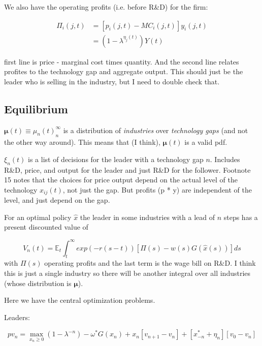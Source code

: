 \documentclass[11pt]{article}
\begin{document}
  We also have the operating profits (i.e. before R\&D) for the firm:
  
  \begin{align*} \label{eq:profits}
    \Pi_i(j, t) &= [p_i(j, t) - MC_i(j, t)]y_i(j, t)\\
                &= (1 - \lambda^{\eta_j(t)})Y(t)
  \end{align*}

  first line is price - marginal cost times quantity.  And the second line relates profites to the technology gap and aggregate output.  This should just be the leader who is selling in the industry, but I need to double check that.

\subsection{Equilibrium}
\label{sub:equilibrium}
  $\bm{\mu}(t) \equiv {\mu_n(t)}_n^\infty$ is a distribution of \emph{industries} over \emph{technology gaps} (and not the other way around).  This means that (I think), $\bm{\mu}(t)$ is a valid pdf.

  $\xi_n(t)$ is a list of decisions for the leader with a technology gap $n$.  Includes R\&D, price, and output for the leader and just R\&D for the follower.  Footnote 15 notes that the choices for price output depend on the actual level of the technology $x_{ij}(t)$, not just the gap.  But profits (p * y) are independent of the level, and just depend on the gap.

  For an optimal policy $\hat{x}$ the leader in some industries with a lead of $n$ steps has a present discounted value of 

  \begin{equation}
    V_n(t) = \mathbb{E}_t \int_{t}^{\infty} exp(-r(s - t))[\Pi(s) - w(s)G(\hat{x}(s))]ds
  \end{equation}
  with $\Pi(s)$ operating profits and the last term is the wage bill on R\&D.  I think this is just a single industry so there will be another integral over all industries (whose distribution is $\bm{\mu}$).

  Here we have the central optimization problems.

  Leaders:

  \begin{equation} \label{eq:rvf_leader}  %
    pv_n = \max_{x_n \geq 0} (1 - \lambda^{-n}) - \omega^*G(x_n) + x_n[v_{n+1} - v_n] + [x_{-n}^* + \eta_n][v_0 - v_n]
  \end{equation}
\end{document}
